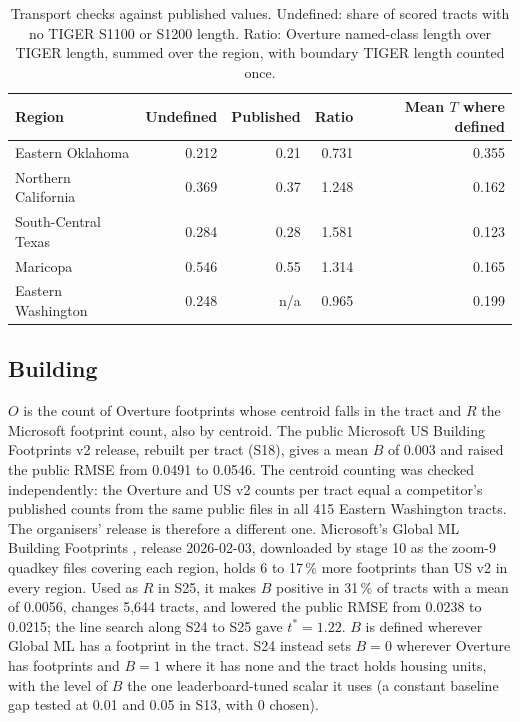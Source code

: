 \documentclass[11pt]{article}
\begin{document}
\begin{table}[htbp]
\centering
\small
\caption{Transport checks against published values. Undefined: share of
scored tracts with no TIGER S1100 or S1200 length. Ratio: Overture
named-class length over TIGER length, summed over the region, with boundary
TIGER length counted once.}
\label{tab:transport}
\begin{tabular}{lrrrr}
\toprule
Region & Undefined & Published & Ratio & Mean $T$ where defined \\
\midrule
Eastern Oklahoma & 0.212 & 0.21 & 0.731 & 0.355 \\
Northern California & 0.369 & 0.37 & 1.248 & 0.162 \\
South-Central Texas & 0.284 & 0.28 & 1.581 & 0.123 \\
Maricopa & 0.546 & 0.55 & 1.314 & 0.165 \\
Eastern Washington & 0.248 & n/a & 0.965 & 0.199 \\
\bottomrule
\end{tabular}
\end{table}

\subsection{Building}

$O$ is the count of Overture footprints whose centroid falls in the tract and
$R$ the Microsoft footprint count, also by centroid. The public Microsoft US
Building Footprints v2 release, rebuilt per tract (S18), gives a mean $B$ of
0.003 and raised the public RMSE from 0.0491 to 0.0546. The centroid counting
was checked independently: the Overture and US v2 counts per tract equal a
competitor's published counts from the same public files in all 415 Eastern
Washington tracts. The organisers' release is therefore a different one.
Microsoft's Global ML Building Footprints \cite{globalml}, release 2026-02-03,
downloaded by stage 10 as the zoom-9 quadkey files covering each region, holds
6 to 17\,\% more footprints than US v2 in every region. Used as $R$ in S25,
it makes $B$ positive in 31\,\% of tracts with a mean of 0.0056, changes 5,644
tracts, and lowered the public RMSE from 0.0238 to 0.0215; the line search along
S24 to S25 gave $t^\ast = 1.22$. $B$ is defined wherever Global ML has a
footprint in the tract. S24 instead sets $B = 0$ wherever Overture has
footprints and $B = 1$ where it has none and the tract holds housing units,
with the level of $B$ the one leaderboard-tuned scalar it uses (a constant
baseline gap tested at 0.01 and 0.05 in S13, with 0 chosen).
\end{document}
